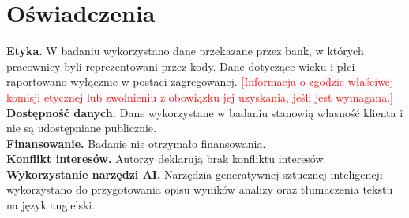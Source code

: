 \documentclass[11pt]{article}
\newcommand{\fillin}[1]{\textcolor{red}{[#1]}}
\begin{document}
\section*{Oświadczenia}

\noindent\textbf{Etyka.}
W badaniu wykorzystano dane przekazane przez bank, w których pracownicy
byli reprezentowani przez kody. Dane dotyczące wieku i płci raportowano
wyłącznie w postaci zagregowanej.
\fillin{Informacja o zgodzie właściwej komisji etycznej lub zwolnieniu
z obowiązku jej uzyskania, jeśli jest wymagana.}\\
\textbf{Dostępność danych.}
Dane wykorzystane w badaniu stanowią własność klienta i nie są
udostępniane publicznie.\\
\textbf{Finansowanie.}
Badanie nie otrzymało finansowania.\\
\textbf{Konflikt interesów.}
Autorzy deklarują brak konfliktu interesów.\\
\textbf{Wykorzystanie narzędzi AI.}
Narzędzia generatywnej sztucznej inteligencji wykorzystano do
przygotowania opisu wyników analizy oraz tłumaczenia tekstu
na język angielski.

\end{document}
